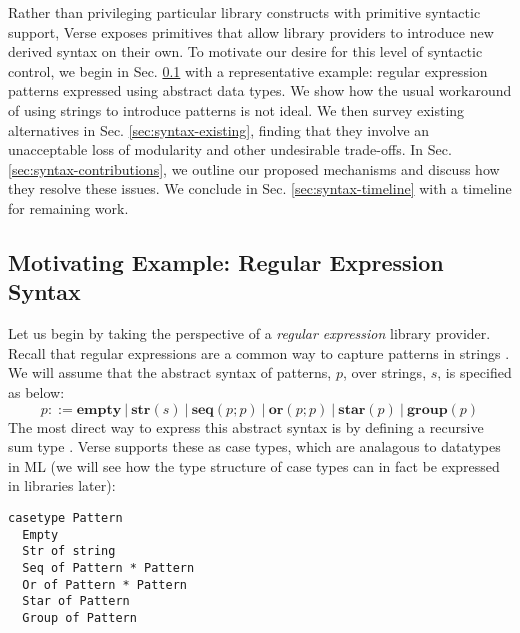 Rather than privileging  particular library constructs with primitive syntactic support, Verse exposes primitives that allow library providers to introduce new derived syntax on their own. %
To motivate our desire for this level of syntactic control, we begin in Sec. \ref{sec:examples} with a representative example: regular expression patterns expressed using abstract data types. We show how the usual workaround of using strings to introduce patterns is not ideal. We then survey existing alternatives in Sec. \ref{sec:syntax-existing}, finding that they involve an unacceptable loss of modularity and other undesirable trade-offs. In Sec. \ref{sec:syntax-contributions}, we outline our proposed mechanisms and discuss how they resolve these issues. We conclude in Sec. \ref{sec:syntax-timeline} with a timeline for remaining work.




\subsection{Motivating Example: Regular Expression Syntax}\label{sec:examples}
Let us begin by taking the perspective of a \emph{regular expression} library provider. Recall that regular expressions are a common way to capture patterns in strings \cite{Thompson:1968:PTR:363347.363387}. We will assume that the abstract syntax of {patterns}, $p$, over strings, $s$, is specified as below:\[p ::= \textbf{empty} ~|~ \textbf{str}(s) ~|~ \textbf{seq}(p; p) ~|~ \textbf{or}(p; p) ~|~ \textbf{star}(p) ~|~ \textbf{group}(p)\]
The most direct way to express this abstract syntax is by defining a recursive sum type \cite{pfpl}. Verse supports these as case types, which are analagous to datatypes in ML (we will see how the type structure  of case types can in fact be expressed in libraries later):

\begin{lstlisting}[numbers=none]
casetype Pattern 
  Empty
  Str of string
  Seq of Pattern * Pattern
  Or of Pattern * Pattern
  Star of Pattern
  Group of Pattern
\end{lstlisting}

